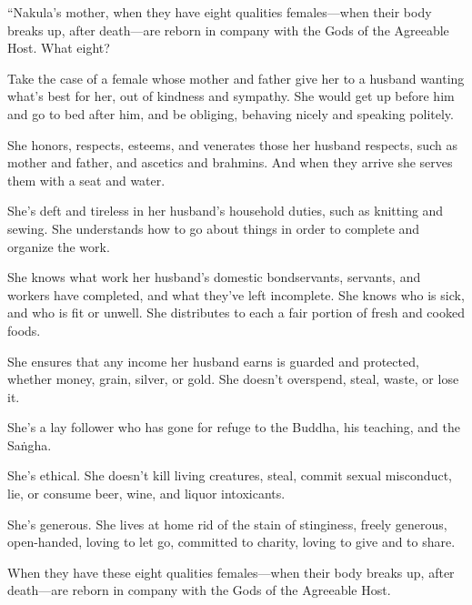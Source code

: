 \documentclass[12pt,openany]{book}%
\begin{document}
“Nakula’s mother, when they have eight qualities females—when their body breaks up, after death—are reborn in company with the Gods of the Agreeable Host. What eight? 

Take the case of a female whose mother and father give her to a husband wanting what’s best for her, out of kindness and sympathy. She would get up before him and go to bed after him, and be obliging, behaving nicely and speaking politely. 

She honors, respects, esteems, and venerates those her husband respects, such as mother and father, and ascetics and brahmins. And when they arrive she serves them with a seat and water. 

She’s deft and tireless in her husband’s household duties, such as knitting and sewing. She understands how to go about things in order to complete and organize the work. 

She knows what work her husband’s domestic bondservants, servants, and workers have completed, and what they’ve left incomplete. She knows who is sick, and who is fit or unwell. She distributes to each a fair portion of fresh and cooked foods. 

She ensures that any income her husband earns is guarded and protected, whether money, grain, silver, or gold. She doesn’t overspend, steal, waste, or lose it. 

She’s a lay follower who has gone for refuge to the Buddha, his teaching, and the \textsanskrit{Saṅgha}. 

She’s ethical. She doesn’t kill living creatures, steal, commit sexual misconduct, lie, or consume beer, wine, and liquor intoxicants. 

She’s generous. She lives at home rid of the stain of stinginess, freely generous, open-handed, loving to let go, committed to charity, loving to give and to share. 

When they have these eight qualities females—when their body breaks up, after death—are reborn in company with the Gods of the Agreeable Host. 
\end{document}
